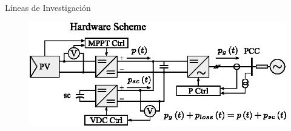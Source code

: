 %
%
\begin{frame}{Líneas de Investigación}
    \begin{figure}
        \centering
        \includegraphics[scale=1.2]{figures/hardware_scheme_2.eps}
    \end{figure}
    
\end{frame}